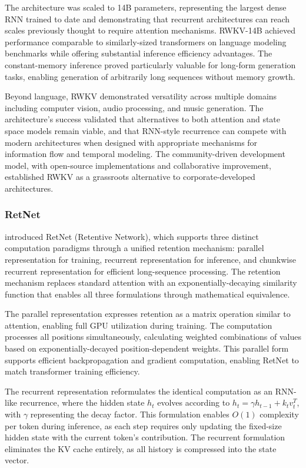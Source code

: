 The architecture was scaled to 14B parameters, representing the largest dense RNN trained to date and demonstrating that recurrent architectures can reach scales previously thought to require attention mechanisms. RWKV-14B achieved performance comparable to similarly-sized transformers on language modeling benchmarks while offering substantial inference efficiency advantages. The constant-memory inference proved particularly valuable for long-form generation tasks, enabling generation of arbitrarily long sequences without memory growth.

Beyond language, RWKV demonstrated versatility across multiple domains including computer vision, audio processing, and music generation. The architecture's success validated that alternatives to both attention and state space models remain viable, and that RNN-style recurrence can compete with modern architectures when designed with appropriate mechanisms for information flow and temporal modeling. The community-driven development model, with open-source implementations and collaborative improvement, established RWKV as a grassroots alternative to corporate-developed architectures.

\subsubsection{RetNet}

\citet{sun2023retentive} introduced RetNet (Retentive Network), which supports three distinct computation paradigms through a unified retention mechanism: parallel representation for training, recurrent representation for inference, and chunkwise recurrent representation for efficient long-sequence processing. The retention mechanism replaces standard attention with an exponentially-decaying similarity function that enables all three formulations through mathematical equivalence.

The parallel representation expresses retention as a matrix operation similar to attention, enabling full GPU utilization during training. The computation processes all positions simultaneously, calculating weighted combinations of values based on exponentially-decayed position-dependent weights. This parallel form supports efficient backpropagation and gradient computation, enabling RetNet to match transformer training efficiency.

The recurrent representation reformulates the identical computation as an RNN-like recurrence, where the hidden state $h_t$ evolves according to $h_t = \gamma h_{t-1} + k_t v_t^T$, with $\gamma$ representing the decay factor. This formulation enables $O(1)$ complexity per token during inference, as each step requires only updating the fixed-size hidden state with the current token's contribution. The recurrent formulation eliminates the KV cache entirely, as all history is compressed into the state vector.

